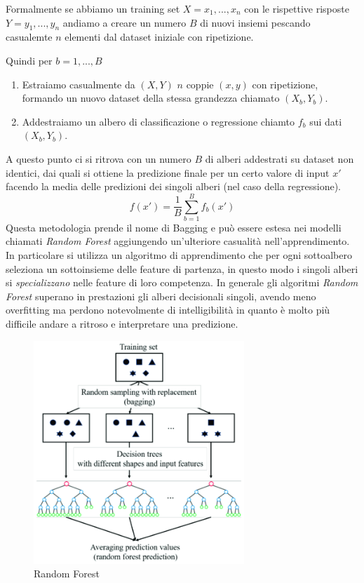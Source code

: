 \documentclass[12pt,a4paper,openright,twoside]{report}
\begin{document}
Formalmente se abbiamo un training set $X = x_{1}, ... , x_{n}$ con le rispettive risposte $Y = y_{1}, ... , y_{n}$ andiamo a creare un numero $B$ di nuovi insiemi pescando casualemte $n$ elementi dal dataset iniziale con ripetizione.

Quindi per $b = 1, ..., B$
\begin{enumerate}
    \item Estraiamo casualmente da $(X,Y)$ $n$ coppie $(x,y)$ con ripetizione, formando un nuovo dataset della stessa grandezza chiamato $(X_{b}, Y_{b})$. 
    \item Addestraiamo un albero di classificazione o regressione chiamto $f_{b}$ sui dati $(X_{b}, Y_{b})$.
\end{enumerate}

A questo punto ci si ritrova con un numero $B$ di alberi addestrati su dataset non identici, dai quali si ottiene la predizione finale per un certo valore di input $x'$ facendo la media delle predizioni dei singoli alberi (nel caso della regressione).
\begin{equation}
    f(x') = \frac{1}{B}\sum_{b=1}^{B} f_{b}(x')
\end{equation}
Questa metodologia prende il nome di Bagging e può essere estesa nei modelli chiamati \emph{Random Forest} \cite{random forest} aggiungendo un'ulteriore casualità nell'apprendimento. In particolare si utilizza un algoritmo di apprendimento che per ogni sottoalbero seleziona un sottoinsieme delle feature di partenza, in questo modo i singoli alberi si \emph{specializzano} nelle feature di loro competenza.
In generale gli algoritmi \emph{Random Forest} superano in prestazioni gli alberi decisionali singoli, avendo meno overfitting ma perdono notevolmente di intelligibilità in quanto è molto più difficile andare a ritroso e interpretare una predizione. 
\begin{center}
\begin{figure}[h]
\centering
\includegraphics[width=300px,keepaspectratio]{random forest.png}
\caption{Random Forest}
\end{figure}    
\end{center}
\end{document}
